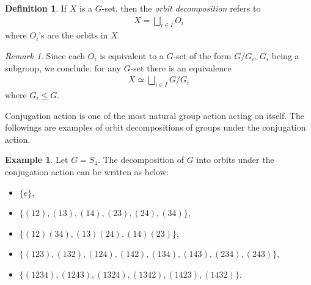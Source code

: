 \documentclass[12pt]{report}
\theoremstyle{plain}
\theoremstyle{remark}
\newtheorem*{remark}{Remark}
\theoremstyle{definition}
\newtheorem{definition}[theorem]{Definition}
\newtheorem{example}[theorem]{Example}
\begin{document}
\begin{definition}
    If $X$ is a $G$-set, then the \emph{orbit decomposition} refers to
    \begin{align*}
        X = \bigsqcup_{i\in I} O_i
    \end{align*}
    where $O_i$'s are the orbits in $X$.
\end{definition}
\begin{remark}
    Since each $O_i$ is equivalent to a $G$-set of the form $G/G_i$, $G_i$ being a subgroup, we conclude: for any $G$-set there is an equivalence
    \begin{align*}
        X\simeq \bigsqcup_{i\in I} G/G_i
    \end{align*}
    where $G_i\le G$.
\end{remark}

Conjugation action is one of the most natural group action acting on itself. The followings are examples of orbit decompositions of groups under the conjugation action.

\begin{example}
    Let $G=S_4$. The decomposition of $G$ into orbits under the conjugation action can be written as below:
    \begin{itemize}
        \item $\{e\}$,
        \item $\{(12),(13),(14),(23),(24),(34)\}$,
        \item $\{(12)(34),(13)(24),(14)(23)\}$,
        \item $\{(123),(132),(124),(142),(134),(143),(234),(243)\}$,
        \item $\{(1234),(1243),(1324),(1342),(1423),(1432)\}$.
    \end{itemize}
\end{example}
\end{document}

